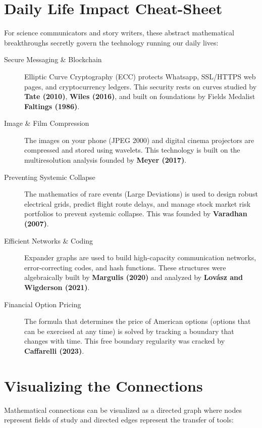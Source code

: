 \section{Daily Life Impact Cheat-Sheet}

For science communicators and story writers, these abstract mathematical breakthroughs secretly govern the technology running our daily lives:

\begin{description}
    \item[Secure Messaging \& Blockchain] Elliptic Curve Cryptography (ECC) protects Whatsapp, SSL/HTTPS web pages, and cryptocurrency ledgers. This security rests on curves studied by \textbf{Tate (2010)}, \textbf{Wiles (2016)}, and built on foundations by Fields Medalist \textbf{Faltings (1986)}.
    
    \item[Image \& Film Compression] The images on your phone (JPEG 2000) and digital cinema projectors are compressed and stored using wavelets. This technology is built on the multiresolution analysis founded by \textbf{Meyer (2017)}.
    
    \item[Preventing Systemic Collapse] The mathematics of rare events (Large Deviations) is used to design robust electrical grids, predict flight route delays, and manage stock market risk portfolios to prevent systemic collapse. This was founded by \textbf{Varadhan (2007)}.
    
    \item[Efficient Networks \& Coding] Expander graphs are used to build high-capacity communication networks, error-correcting codes, and hash functions. These structures were algebraically built by \textbf{Margulis (2020)} and analyzed by \textbf{Lov\'asz and Wigderson (2021)}.
    
    \item[Financial Option Pricing] The formula that determines the price of American options (options that can be exercised at any time) is solved by tracking a boundary that changes with time. This free boundary regularity was cracked by \textbf{Caffarelli (2023)}.
\end{description}

\section{Visualizing the Connections}
Mathematical connections can be visualized as a directed graph where nodes represent fields of study and directed edges represent the transfer of tools:


